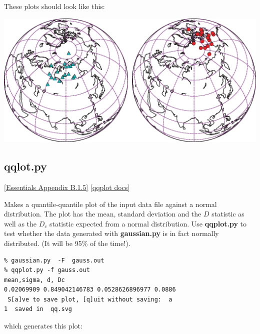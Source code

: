 \documentclass[11pt]{book}
\begin{document}
{{These plots should look like this:

\includegraphics[width=15cm]{EPSfiles/pt_rot_panA.eps}


\subsection{qqlot.py} \href{http://earthref.org/MAGIC/books/Tauxe/Essentials/WebBook3ap2.html#quantile_quantile_plots}{[Essentials Appendix B.1.5]}
\href{https://github.com/PmagPy/PmagPy/blob/master/programs/qqplot.py}{[qqplot docs]}


Makes a quantile-quantile plot  of the input data file against a normal distribution.
The plot has the mean, standard deviation and the $D$ statistic as well as the $D_c$ statistic expected from
a normal distribution.  Use {\bf qqplot.py} to test whether the data generated with {\bf gaussian.py} is in fact normally distributed.
(It will be 95\% of the time!).

\begin{verbatim}
% gaussian.py  -F  gauss.out
% qqplot.py -f gauss.out
mean,sigma, d, Dc
0.02069909 0.849042146783 0.0528626896977 0.0886
 S[a]ve to save plot, [q]uit without saving:  a
1  saved in  qq.svg
\end{verbatim}

\noindent which generates this plot:

}}
\end{document}
